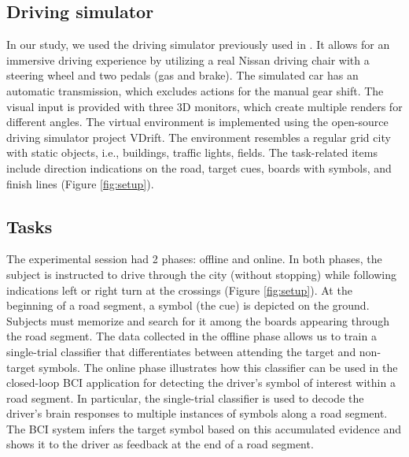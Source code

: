 \documentclass[12pt]{iopart}
\begin{document}
\subsection{Driving simulator}
In our study, we used the driving simulator previously used in
\cite{khaliliardali_action_2015,zhang_eeg-based_2015,renold_eeg_2014}.
It allows for an immersive driving experience by utilizing
a real Nissan driving chair with a steering wheel and two pedals (gas and brake).
The simulated car has an automatic transmission, which excludes actions for
the manual gear shift.
The visual input is provided with three 3D monitors, which create multiple renders for
different angles. The virtual environment is implemented using
the open-source driving simulator project VDrift. %
The environment resembles a regular grid city with static objects, i.e.,
buildings, traffic lights, fields. The task-related items include
direction indications on the road, target cues, boards with symbols,
and finish lines (Figure \ref{fig:setup}).



\subsection{Tasks}
The experimental session had 2 phases: offline and online. In both phases, the subject is instructed to drive through the city (without stopping) while
following indications left or right turn at the crossings (Figure \ref{fig:setup}).
At the beginning of a road segment, a symbol (the cue) is depicted
on the ground. Subjects must memorize and search for it among
the boards appearing through the road segment. 
The data collected in the offline phase allows us to train a single-trial classifier that differentiates between attending the target and non-target symbols.
The online phase illustrates how this classifier can be used in the closed-loop BCI application for detecting the driver's symbol of interest within a road segment.
In particular, the single-trial classifier is used to decode the driver's brain responses to multiple instances of symbols along a road segment. The BCI system infers the target symbol based on this accumulated evidence and shows it to the driver as feedback at the end of a road segment.
\end{document}
